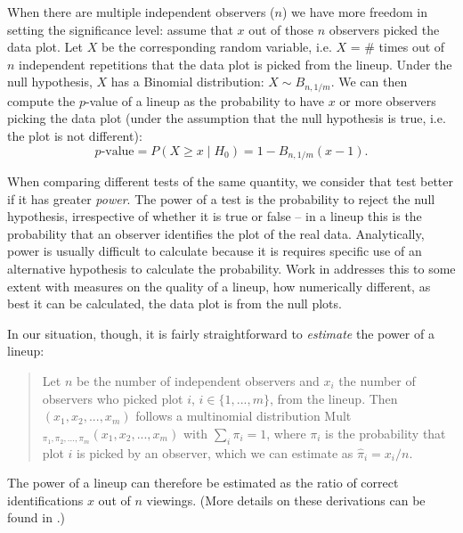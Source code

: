 When there are multiple independent observers ($n$) we have more freedom in setting  the significance level: assume that $x$ out of those $n$ observers picked the data plot. Let $X$ be the corresponding random variable, i.e. $X$ = \# times out of $n$ independent repetitions that  the data plot is picked from the lineup. Under the null hypothesis, $X$ has a Binomial distribution: $X \sim B_{n, 1/m}$. We can then compute the $p$-value of a lineup as the probability to have $x$ or more observers picking the data plot (under the assumption that the null hypothesis is true, i.e. the plot is not different):
\[
p\text{-value} = P(X \ge x \mid H_0) =   1 - B_{n, 1/m} (x-1).
\]

When comparing different tests of the same quantity, we consider that
test better if it has greater {\it power}.  The power of a test is the
probability to reject the null hypothesis, irrespective of whether it
is true or false -- in a lineup this is the probability that an
observer identifies the plot of the real data.  Analytically, power is
usually difficult to calculate because it is requires specific use of
an alternative hypothesis to calculate the probability.  Work in
\cite{niladri:2012} addresses this to some extent with measures on
the quality of a lineup, how numerically different, as best it can be
calculated, the data plot is from the null plots.

In our situation, though, it is fairly straightforward to {\it estimate} the power of a lineup:

\begin{quote}
Let $n$ be the number of independent observers and $x_i$ the number of observers who picked plot $i$, $i \in \{1, ..., m\}$, from the lineup. Then $(x_1, x_2, ..., x_m)$ follows a multinomial distribution Mult$_{\pi_1, \pi_2, ..., \pi_m}(x_1, x_2, ..., x_m)$ with $\sum_i \pi_i = 1$, where $\pi_i$ is the probability that plot $i$ is picked by an observer, which we can estimate as $\widehat{\pi}_i = x_i/n$. 
\end{quote}

\noindent The power of a lineup can therefore be estimated as the ratio of correct identifications $x$ out of $n$ viewings. (More details on these derivations can be found in \cite{majumder:2012}.)

